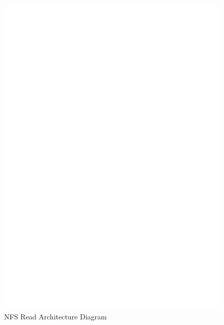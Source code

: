  
\begin{figure}
\centering
\includegraphics[scale=0.7]{figures/Read.eps}
\caption{NFS Read Architecture Diagram}
\label{fig:NFSReadArch}
\end{figure}
\FloatBarrier




 
 
 









